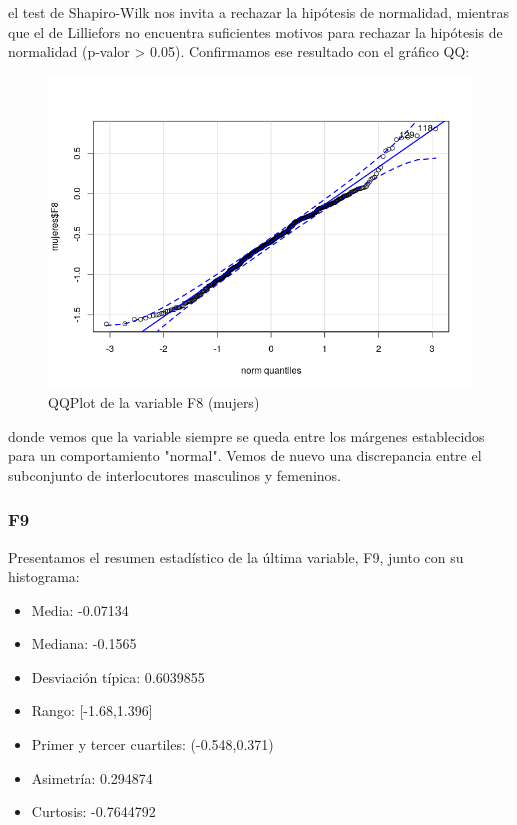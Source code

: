 el test de Shapiro-Wilk nos invita a rechazar la hipótesis de normalidad, mientras que el de Lilliefors no encuentra suficientes motivos para rechazar la hipótesis de normalidad (p-valor > 0.05). Confirmamos ese resultado con el gráfico QQ:

\begin{figure}[H] %
	\centering
	\includegraphics[scale=0.6]{qq-F8m.png}  %
	\caption{QQPlot de la variable F8 (mujers)} 
	\label{fig:qq-F8m}
\end{figure}

donde vemos que la variable siempre se queda entre los márgenes establecidos para un comportamiento "normal". Vemos de nuevo una discrepancia entre el subconjunto de interlocutores masculinos y femeninos.

\subsubsection{F9}

Presentamos el resumen estadístico de la última variable, F9, junto con su histograma:

\begin{itemize}
	\item Media: -0.07134
	\item Mediana: -0.1565
	\item Desviación típica: 0.6039855
	\item Rango: [-1.68,1.396]
	\item Primer y tercer cuartiles: (-0.548,0.371)
	\item Asimetría: 0.294874
	\item Curtosis: -0.7644792
\end{itemize}

